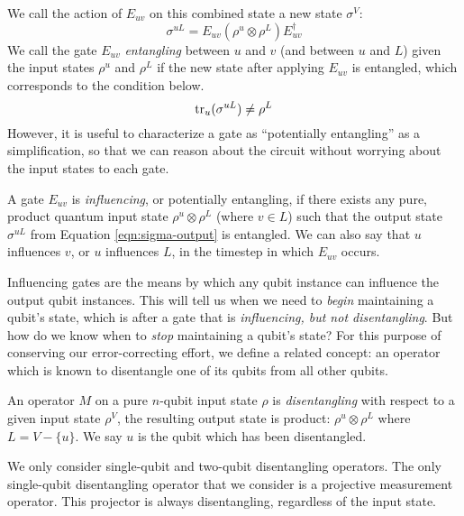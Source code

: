 We call the action of $E_{uv}$ on this combined state a new state $\sigma^{V}$:
%
\begin{equation}
\sigma^{uL} = E_{uv} (\rho^{u}\otimes \rho^{L}) E^{\dagger}_{uv}
\label{eqn:sigma-output}
\end{equation}
%
We call the gate $E_{uv}$ \emph{entangling} between $u$ and $v$
(and between $u$ and $L$) given the input states $\rho^{u}$ and $\rho^{L}$ if
the new state after applying $E_{uv}$ is entangled, which corresponds to
the condition below.
%
\begin{equation}
\text{tr}_{u}( \sigma^{uL} ) \ne \rho^{L}
\end{equation}
%
However, it is useful to characterize a gate as ``potentially entangling''
as a simplification, so that we can reason about the circuit without
worrying about the input states to each gate.
%
\begin{definition}
A gate $E_{uv}$ is \emph{influencing}, or potentially entangling, if
there exists any pure, product quantum input state $\rho^{u} \otimes \rho^{L}$
(where $v \in L$) such that the output state $\sigma^{uL}$ from
Equation \ref{eqn:sigma-output}
is entangled. We can also say that $u$ influences $v$, or $u$ influences
$L$, in the timestep in which $E_{uv}$ occurs.
\end{definition}

Influencing gates are the means by which any qubit instance can influence
the output qubit instances. This will tell us when we need to \emph{begin}
maintaining a qubit's state, which is after a gate that is
\emph{influencing, but not disentangling}.
But how do we know when to \emph{stop} maintaining a qubit's state?
For this purpose of conserving our error-correcting effort, we define
a related concept: an operator which is known to disentangle
one of its qubits from all other qubits.

\begin{definition}
An operator $M$ on a pure $n$-qubit input state $\rho$ is 
\emph{disentangling} with respect to a given input state $\rho^{V}$,
the resulting output state is product:
$\rho^{u} \otimes \rho^{L}$ where $L = V - \{u\}$.
We say $u$ is the
qubit which has been disentangled.
\end{definition}

We only consider single-qubit and two-qubit disentangling operators.
The only single-qubit disentangling operator that we consider
is a projective measurement operator. This projector is always disentangling,
regardless of the input state.

